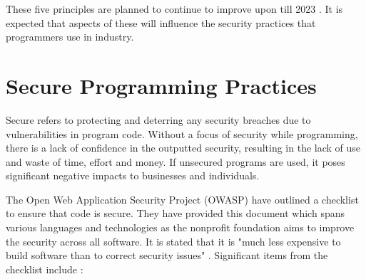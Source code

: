 \par These five principles are planned to continue to improve upon till 2023 \cite{securitystrat}. It is expected that aspects of these will influence the security practices that programmers use in industry. 

\section{Secure Programming Practices}

Secure refers to protecting and deterring any security breaches due to vulnerabilities in program code. Without a focus of security while programming, there is a lack of confidence in the outputted security, resulting in the lack of use and waste of time, effort and money. If unsecured programs are used, it poses significant negative impacts to businesses and individuals. 
\newline
\par The Open Web Application Security Project (OWASP) have outlined a checklist to ensure that code is secure. They have provided this document which spans various languages and technologies as the nonprofit foundation aims to improve the security across all software. It is stated that it is "much less expensive to build software than to correct security issues" \cite{owasp}.
\newline
\newline
Significant items from the checklist include \cite{owasp}: 

